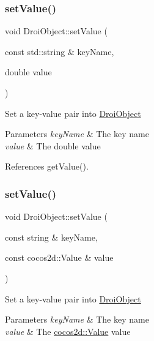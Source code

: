 \subsubsection{\texorpdfstring{set\+Value()}{setValue()}\hspace{0.1cm}{\footnotesize\ttfamily [4/11]}}
{\footnotesize\ttfamily void Droi\+Object\+::set\+Value (\begin{DoxyParamCaption}\item[{const std\+::string \&}]{key\+Name,  }\item[{double}]{value }\end{DoxyParamCaption})}

Set a key-\/value pair into \hyperlink{class_droi_object}{Droi\+Object} 
\begin{DoxyParams}{Parameters}
{\em key\+Name} & The key name \\
\hline
{\em value} & The double value \\
\hline
\end{DoxyParams}


References get\+Value().

\mbox{\label{class_droi_object_ab8db04deada87fb168a028299bf681f8}} 
\subsubsection{\texorpdfstring{set\+Value()}{setValue()}\hspace{0.1cm}{\footnotesize\ttfamily [5/11]}}
{\footnotesize\ttfamily void Droi\+Object\+::set\+Value (\begin{DoxyParamCaption}\item[{const string \&}]{key\+Name,  }\item[{const cocos2d\+::\+Value \&}]{value }\end{DoxyParamCaption})}

Set a key-\/value pair into \hyperlink{class_droi_object}{Droi\+Object} 
\begin{DoxyParams}{Parameters}
{\em key\+Name} & The key name \\
\hline
{\em value} & The \hyperlink{}{cocos2d\+::\+Value} value \\
\hline
\end{DoxyParams}
\mbox{\label{class_droi_object_a15dfff792290ec97db60876d66289147}} 
